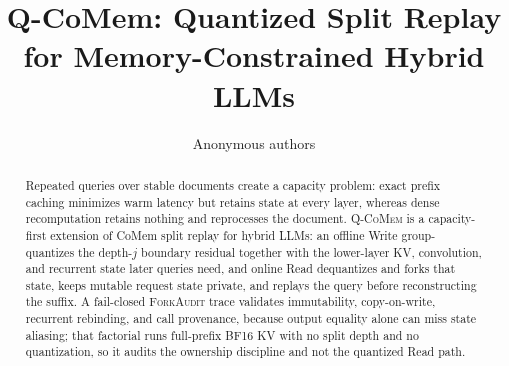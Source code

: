 \documentclass{article}
\title{Q-CoMem: Quantized Split Replay for Memory-Constrained Hybrid LLMs}
\author{Anonymous authors}
\newcommand{\qcomem}{\textsc{Q-CoMem}}
\newcommand{\method}{\textsc{ForkAudit}}
\begin{document}
\raggedbottom
\maketitle

\begin{abstract}
Repeated queries over stable documents create a capacity problem: exact prefix
caching minimizes warm latency but retains state at every layer, whereas dense
recomputation retains nothing and reprocesses the document.  \qcomem{} is a
capacity-first extension of CoMem split replay for hybrid LLMs: an offline Write
group-quantizes the depth-$j$ boundary residual together with the lower-layer
KV, convolution, and recurrent state later queries need, and online Read
dequantizes and forks that state, keeps mutable request state private, and
replays the query before reconstructing the suffix.  A fail-closed \method{}
trace validates immutability, copy-on-write, recurrent rebinding, and call
provenance, because output equality alone can miss state aliasing; that
factorial runs full-prefix BF16 KV with no split depth and no quantization, so
it audits the ownership discipline and not the quantized Read path.


\end{abstract}
\end{document}
